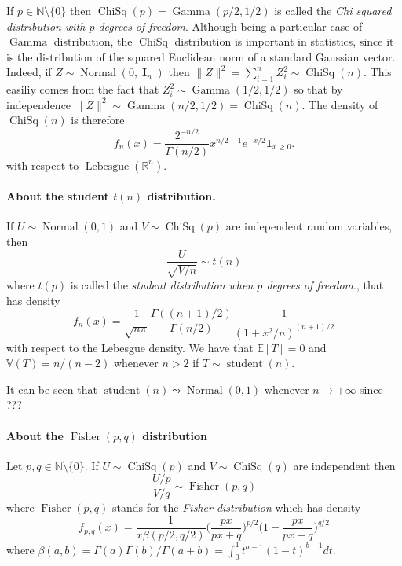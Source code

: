 \documentclass[
	fontsize=11pt, %
	twoside=false, %
	numbers=noenddot, %
]{kaobook}
\DeclareMathOperator{\bI}{\boldsymbol I}
\DeclareMathOperator{\chisq}{ChiSq}
\DeclareMathOperator{\fis}{Fisher}
\DeclareMathOperator{\gam}{Gamma}
\DeclareMathOperator{\nor}{Normal}
\DeclareMathOperator{\stu}{student}
\DeclareMathOperator{\leb}{Lebesgue}
\newcommand{\E}{\mathbb E}
\newcommand{\R}{\mathbb R}
\newcommand{\N}{\mathbb N}
\newcommand{\var}{\mathbb V}
\newcommand{\ind}[1]{\mathbf 1_{#1}}
\newcommand{\norm}[1]{\|#1\|}
\newcommand{\gosto}{\leadsto}
\begin{document}
If $p \in \N \setminus \{ 0 \}$ then $\chisq(p) = \gam(p/2, 1/2)$ is called the \emph{Chi squared distribution with $p$ degrees of freedom}.
Although being a particular case of $\gam$ distribution, the $\chisq$ distribution is important in statistics, since it is the distribution of the squared Euclidean norm of a standard Gaussian vector.
Indeed, if $Z \sim \nor(0, \bI_n)$ then $\norm{Z}^2 = \sum_{i=1}^n Z_i^2 \sim \chisq(n)$.
This easiliy comes from the fact that $Z_i^2 \sim \gam(1/2, 1/2)$ so that by independence $\norm{Z}^2 \sim \gam(n/2, 1/2) = \chisq(n)$.
The density of $\chisq(n)$ is therefore 
\begin{equation*}
	f_n(x) = \frac{2^{-n / 2}}{\Gamma(n/2)} x^{n / 2 - 1} e^{-x / 2} \ind{x \geq 0}.
\end{equation*}
with respect to $\leb(\R^n)$.

\paragraph{About the student $t(n)$ distribution.} %


If $U \sim \nor(0, 1)$ and $V \sim \chisq(p)$ are independent random variables, then
\begin{equation*}
	\frac{U}{\sqrt{V / n}} \sim t(n)
\end{equation*}
where $t(p)$ is called the \emph{student distribution when $p$ degrees of freedom}., that has density
\begin{equation*}
	f_n(x) = \frac{1}{\sqrt{n \pi}} \frac{\Gamma((n+1) / 2)}{\Gamma(n/2)} \frac{1}{(1 + x^2 / n)^{(n + 1)/2}}
\end{equation*}
with respect to the Lebesgue density. We have that $\E[T] = 0$ and $\var(T) = n / (n - 2)$ whenever $n > 2$ if $T \sim \stu(n)$.

It can be seen that $\stu(n) \gosto \nor(0, 1)$ whenever $n \rightarrow +\infty$ since ???

\paragraph{About the $\fis(p, q)$ distribution} %

Let $p, q \in \N \setminus \{ 0 \} $. If $U \sim \chisq(p)$ and $V \sim \chisq(q)$ are independent then
\begin{equation*}
	\frac{U / p}{V / q} \sim \fis(p, q)
\end{equation*}
where $\fis(p, q)$ stands for the \emph{Fisher distribution} which has density
\begin{equation*}
	f_{p, q}(x) = \frac{1}{x \beta(p/2, q/2)} \Big( \frac{px}{px + q} \Big)^{p/2} \Big(1 - \frac{px}{px + q} \Big)^{q/2}
\end{equation*}
where $\beta(a, b) = \Gamma(a) \Gamma(b) / \Gamma(a + b) = \int_0^1 t^{a-1} (1 - t)^{b - 1} dt$.
\end{document}
